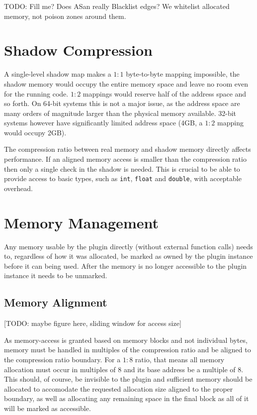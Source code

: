TODO: Fill me? Does ASan really Blacklist edges? We whitelist allocated memory,
not poison zones around them.


\section {Shadow Compression}

A single-level shadow map makes a $1:1$ byte-to-byte mapping impossible, the
shadow memory would occupy the entire memory space and leave no room even for
the running code. $1:2$ mappings would reserve half of the address space and so
forth. On 64-bit systems this is not a major issue, as the address space are
many orders of magnitude larger than the physical memory available. 32-bit
systems however have significantly limited address space (4GB, a $1:2$ mapping
would occupy 2GB).

The compression ratio between real memory and shadow memory directly affects
performance. If an aligned memory access is smaller than the compression ratio
then only a single check in the shadow is needed. This is crucial to be able to
provide access to basic types, such as \texttt{int}, \texttt{float} and
\texttt{double}, with acceptable overhead.


\section {Memory Management}

Any memory usable by the plugin directly (without external function calls) needs
to, regardless of how it was allocated, be marked as owned by the plugin
instance before it can being used. After the memory is no longer accessible to
the plugin instance it needs to be unmarked.

\subsection {Memory Alignment}

[TODO: maybe figure here, sliding window for access size]

As memory-access is granted based on memory blocks and not individual bytes,
memory must be handled in multiples of the compression ratio and be aligned to
the compression ratio boundary. For a $1:8$ ratio, that means all memory
allocation must occur in multiples of $8$ and its base address be a multiple of
$8$. This should, of course, be invisible to the plugin and sufficient memory
should be allocated to accomodate the requested allocation size aligned to the
proper boundary, as well as allocating any remaining space in the final block as
all of it will be marked as accessible.

